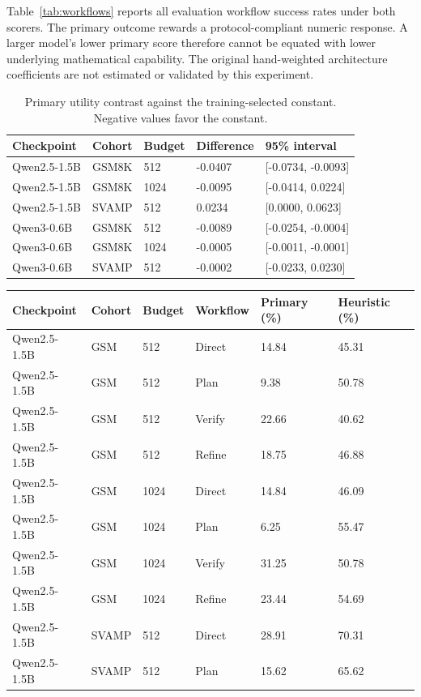 \documentclass[10pt]{article}
\begin{document}
Table~\ref{tab:workflows} reports all evaluation workflow success rates under both scorers. The primary outcome rewards a protocol-compliant numeric response. A larger model's lower primary score therefore cannot be equated with lower underlying mathematical capability. The original hand-weighted architecture coefficients are not estimated or validated by this experiment.
\begin{table}[ht]
\centering\small
\begin{tabular}{lllll}
\toprule
Checkpoint & Cohort & Budget & Difference & 95\% interval\\
\midrule
Qwen2.5-1.5B & GSM8K & 512 & -0.0407 & [-0.0734, -0.0093]\\
Qwen2.5-1.5B & GSM8K & 1024 & -0.0095 & [-0.0414, 0.0224]\\
Qwen2.5-1.5B & SVAMP & 512 & 0.0234 & [0.0000, 0.0623]\\
Qwen3-0.6B & GSM8K & 512 & -0.0089 & [-0.0254, -0.0004]\\
Qwen3-0.6B & GSM8K & 1024 & -0.0005 & [-0.0011, -0.0001]\\
Qwen3-0.6B & SVAMP & 512 & -0.0002 & [-0.0233, 0.0230]\\
\bottomrule\end{tabular}
\caption{Primary utility contrast against the training-selected constant. Negative values favor the constant.}
\label{tab:policy}
\end{table}\begin{table}[ht]
\centering\small
\begin{tabular}{llllll}
\toprule
Checkpoint & Cohort & Budget & Workflow & Primary (\%) & Heuristic (\%)\\
\midrule
Qwen2.5-1.5B & GSM & 512 & Direct & 14.84 & 45.31\\
Qwen2.5-1.5B & GSM & 512 & Plan & 9.38 & 50.78\\
Qwen2.5-1.5B & GSM & 512 & Verify & 22.66 & 40.62\\
Qwen2.5-1.5B & GSM & 512 & Refine & 18.75 & 46.88\\
Qwen2.5-1.5B & GSM & 1024 & Direct & 14.84 & 46.09\\
Qwen2.5-1.5B & GSM & 1024 & Plan & 6.25 & 55.47\\
Qwen2.5-1.5B & GSM & 1024 & Verify & 31.25 & 50.78\\
Qwen2.5-1.5B & GSM & 1024 & Refine & 23.44 & 54.69\\
Qwen2.5-1.5B & SVAMP & 512 & Direct & 28.91 & 70.31\\
Qwen2.5-1.5B & SVAMP & 512 & Plan & 15.62 & 65.62\\

\end{tabular}
\end{table}
\end{document}

